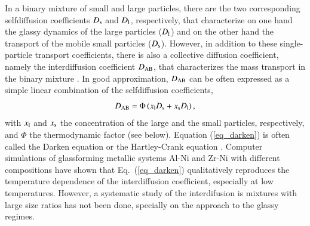 In a binary mixture of small and large particles, there are the two corresponding selfdiffusion coefficients $D_{\rm s}$ and $D_{\rm l}$, respectively, that characterize on one hand the glassy dynamics of the large particles ($D_{\rm l}$) and on the other hand the transport of the mobile small particles ($D_{\rm s}$). However, in addition to these single-particle transport coefficients, there is also a collective diffusion coefficient, namely the interdiffusion coefficient $D_{\rm AB}$, that characterizes the mass transport in the binary mixture \cite{fitts1962, akcasu1997, horbach2007}. In good approximation, $D_{\rm AB}$ can be often expressed as a simple linear combination of the selfdiffusion coefficients,
%
\begin{equation}
D_{\rm AB} = \Phi \left( x_{\rm l} D_{\rm s} + x_{\rm s} D_{\rm l} \right), 
\label{eq_darken}
\end{equation}
%
with $x_{\rm l}$ and $x_{\rm s}$ the concentration of the large and the small particles, respectively, and $\Phi$ the thermodynamic factor (see below). Equation (\ref{eq_darken}) is often called  the Darken equation \cite{darken1949} or the Hartley-Crank equation \cite{hartley1949}.  Computer simulations of glassforming metallic systems Al-Ni and Zr-Ni with different compositions \cite{horbach2007, kuhn2014} have shown that Eq.~(\ref{eq_darken}) qualitatively reproduces the temperature dependence of the interdiffusion coefficient, especially at low temperatures. However, a systematic study of the interdifusion is mixtures with large size ratios has not been done, specially on the approach to the glassy regimes.


